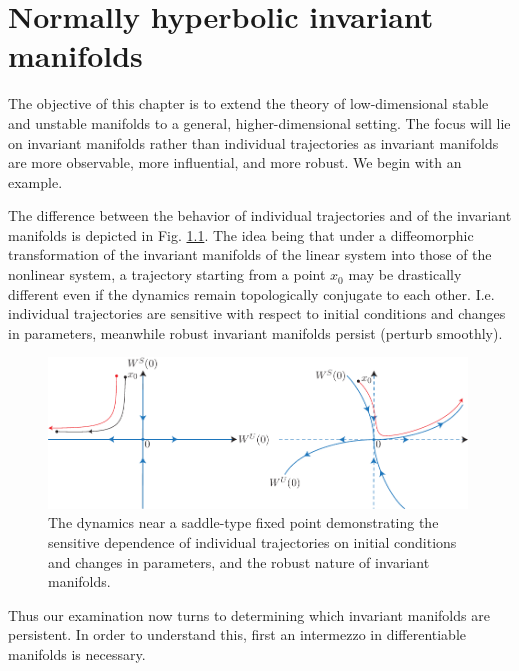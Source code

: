 \chapter{Normally hyperbolic invariant manifolds}
The objective of this chapter is to extend the theory of low-dimensional stable and unstable manifolds to a general, higher-dimensional setting. The focus will lie on invariant manifolds rather than individual trajectories as invariant manifolds are more observable, more influential, and more robust. We begin with an example.

\begin{ex}
	The difference between the behavior of individual trajectories and of the invariant manifolds is depicted in Fig. \ref{fig:individual_trajectory}. The idea being that under a diffeomorphic transformation of the invariant manifolds of the linear system into those of the nonlinear system, a trajectory starting from a point $x_0$ may be drastically different even if the dynamics remain topologically conjugate to each other. I.e. individual trajectories are sensitive with respect to initial conditions and changes in parameters, meanwhile robust invariant manifolds persist (perturb smoothly).
	\begin{figure}[h!]
		\centering
		\includegraphics[width=0.99\textwidth]{figures/ch9/1individual_trajectory.pdf}
		\caption{The dynamics near a saddle-type fixed point demonstrating the sensitive dependence of individual trajectories on initial conditions and changes in parameters, and the robust nature of invariant manifolds.}
		\label{fig:individual_trajectory}
	\end{figure}
\end{ex}

Thus our examination now turns to determining which invariant manifolds are persistent. In order to understand this, first an intermezzo in differentiable manifolds is necessary.

